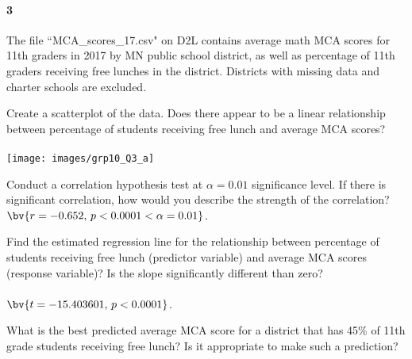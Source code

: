 \documentclass{article}
\begin{document}
\begin{flushleft}
\newpage
\paragraph{3} The file ``MCA\_scores\_17.csv" on D2L contains average math MCA scores for 11th graders in 2017 by MN public school district, as well as percentage of 11th graders receiving free lunches in the district. Districts with missing data and charter schools are excluded.
\begin{enumalpha}
\item Create a scatterplot of the data. Does there appear to be a linear relationship between percentage of students receiving free lunch and average MCA scores?\\
\medskip
{}\\
\medskip
\texttt{[image: images/grp10\_Q3\_a]}
\vspace{.5in}
\item Conduct a correlation hypothesis test at $\alpha = 0.01$ significance level. If there is significant correlation, how would you describe the strength of the correlation?\\
\medskip
$\bv{r = -0.652, \, p <0.0001 < \alpha = 0.01}$. 
\newpage
\item Find the estimated regression line for the relationship between percentage of students receiving free lunch (predictor variable) and average MCA scores (response variable)? Is the slope significantly different than zero?\\
\medskip
{}\\
$\bv{t = -15.403601, \, p < 0.0001}$. 
\vspace{.5in}
\item What is the best predicted average MCA score for a district that has 45\% of 11th grade students receiving free lunch? Is it appropriate to make such a prediction?\\
\medskip
{}\\
\\
\\
\medskip
{}
\end{enumalpha}



\end{flushleft}
\end{document}

